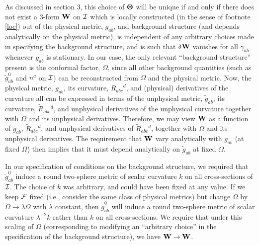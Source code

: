 As discussed in section 3, this choice of ${\mbox{\boldmath
$\Theta$}}$ will be unique if and only if there does not exist a
$3$-form $\bf W$ on ${\cal I}$ which is locally constructed (in the
sense of footnote \ref{loc}) out of the physical metric, $g_{ab}$, and
background structure (and depends analytically on the physical
metric), is independent of any arbitrary choices made in specifying
the background structure, and is such that $\delta {\bf W}$ vanishes
for all $\gamma_{ab}$ whenever $g_{ab}$ is stationary. In our case,
the only relevant ``background structure'' present is the conformal
factor, $\Omega$, since all other background quantities (such as
$\tilde{g}^0_{ab}$ and $n^a$ on $\cal I$) can be reconstructed from
$\Omega$ and the physical metric.  Now, the physical metric, $g_{ab}$,
its curvature, ${R_{abc}}^d$, and (physical) derivatives of the
curvature all can be expressed in terms of the unphysical metric,
$\tilde{g}_{ab}$, its curvature, $\tilde{R}_{abc}{}^d$, and unphysical
derivatives of the unphysical curvature together with $\Omega$ and its
unphysical derivatives. Therefore, we may view $\bf W$ as a function
of $\tilde{g}_{ab}$, $\tilde{R}_{abc}{}^d$, and unphysical derivatives
of $\tilde{R}_{abc}{}^d$, together with $\Omega$ and its unphysical
derivatives. The requirement that $\bf W$ vary analytically with
$g_{ab}$ (at fixed $\Omega$) then implies that it must depend
analytically on $\tilde{g}_{ab}$ at fixed $\Omega$.

In our specification of conditions on the background structure, we
required that $\tilde{g}^0_{ab}$ induce a round two-sphere metric of
scalar curvature $k$ on all cross-sections of ${\cal I}$. The choice
of $k$ was arbitrary, and could have been fixed at any value.  If we
keep $\cal F$ fixed (i.e., consider the same class of physical
metrics) but change $\Omega$ by $\Omega \rightarrow \lambda \Omega$
with $\lambda$ constant, then $\tilde{g}^0_{ab}$ will induce a round
two-sphere metric of scalar curvature $\lambda^{-2} k$ rather than $k$
on all cross-sections. We require that under this scaling of $\Omega$
(corresponding to modifying an ``arbitrary choice'' in the
specification of the background structure), we have ${\bf W}
\rightarrow {\bf W}$.

